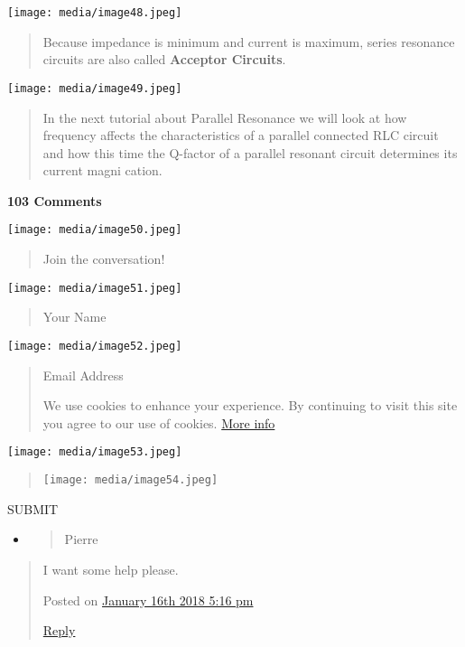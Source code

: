 \documentclass[]{article}
\begin{document}
\texttt{[image: media/image48.jpeg]}

\begin{quote}
Because impedance is minimum and current is maximum, series resonance
circuits are also called \textbf{Acceptor Circuits}.
\end{quote}

\texttt{[image: media/image49.jpeg]}

\begin{quote}
In the next tutorial about Parallel Resonance we will look at how
frequency affects the characteristics of a parallel connected RLC
circuit and how this time the Q-factor of a parallel resonant circuit
determines its current magni cation.
\end{quote}

\textbf{103 Comments}

\texttt{[image: media/image50.jpeg]}

\begin{quote}
Join the conversation!
\end{quote}

\texttt{[image: media/image51.jpeg]}

\begin{quote}
Your Name
\end{quote}

\texttt{[image: media/image52.jpeg]}

\begin{quote}
Email Address

We use cookies to enhance your experience. By continuing to visit this
site you agree to our use of cookies.
\href{http://wikipedia.org/wiki/HTTP_cookie}{More info}
\end{quote}

\texttt{[image: media/image53.jpeg]}

\begin{quote}
\texttt{[image: media/image54.jpeg]}
\end{quote}

SUBMIT

\begin{itemize}
\item
  \begin{quote}
  Pierre
  \end{quote}
\end{itemize}

\begin{quote}
I want some help please.

Posted on \protect\hyperlink{page10}{January 16th 2018 \textbar{} 5:16
pm}

\href{https://www.electronics-tutorials.ws/accircuits/series-resonance.html?replytocom=47334\#respond}{Reply}
\end{quote}
\end{document}

